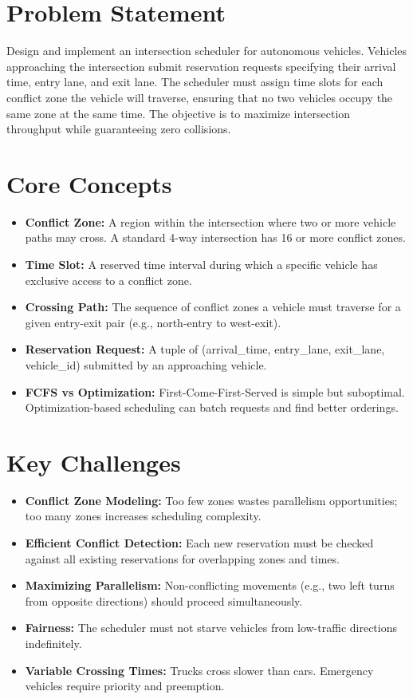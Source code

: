 \section{Problem Statement}

Design and implement an intersection scheduler for autonomous vehicles. Vehicles approaching the intersection submit reservation requests specifying their arrival time, entry lane, and exit lane. The scheduler must assign time slots for each conflict zone the vehicle will traverse, ensuring that no two vehicles occupy the same zone at the same time. The objective is to maximize intersection throughput while guaranteeing zero collisions.

\section{Core Concepts}

\begin{itemize}
  \item \textbf{Conflict Zone:} A region within the intersection where two or more vehicle paths may cross. A standard 4-way intersection has 16 or more conflict zones.
  \item \textbf{Time Slot:} A reserved time interval during which a specific vehicle has exclusive access to a conflict zone.
  \item \textbf{Crossing Path:} The sequence of conflict zones a vehicle must traverse for a given entry-exit pair (e.g., north-entry to west-exit).
  \item \textbf{Reservation Request:} A tuple of (arrival\_time, entry\_lane, exit\_lane, vehicle\_id) submitted by an approaching vehicle.
  \item \textbf{FCFS vs Optimization:} First-Come-First-Served is simple but suboptimal. Optimization-based scheduling can batch requests and find better orderings.
\end{itemize}

\section{Key Challenges}

\begin{itemize}
  \item \textbf{Conflict Zone Modeling:} Too few zones wastes parallelism opportunities; too many zones increases scheduling complexity.
  \item \textbf{Efficient Conflict Detection:} Each new reservation must be checked against all existing reservations for overlapping zones and times.
  \item \textbf{Maximizing Parallelism:} Non-conflicting movements (e.g., two left turns from opposite directions) should proceed simultaneously.
  \item \textbf{Fairness:} The scheduler must not starve vehicles from low-traffic directions indefinitely.
  \item \textbf{Variable Crossing Times:} Trucks cross slower than cars. Emergency vehicles require priority and preemption.
\end{itemize}

